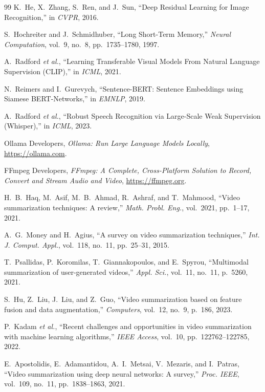 \documentclass[10pt,conference]{IEEEtran}
\begin{document}
\begin{thebibliography}{99}
K.~He, X.~Zhang, S.~Ren, and J.~Sun,
``Deep Residual Learning for Image Recognition,''
in \textit{CVPR}, 2016.

S.~Hochreiter and J.~Schmidhuber,
``Long Short-Term Memory,''
\textit{Neural Computation}, vol.~9, no.~8, pp.~1735--1780, 1997.

A.~Radford \textit{et al.},
``Learning Transferable Visual Models From Natural Language Supervision (CLIP),''
in \textit{ICML}, 2021.

N.~Reimers and I.~Gurevych,
``Sentence-BERT: Sentence Embeddings using Siamese BERT-Networks,''
in \textit{EMNLP}, 2019.

A.~Radford \textit{et al.},
``Robust Speech Recognition via Large-Scale Weak Supervision (Whisper),''
in \textit{ICML}, 2023.

Ollama Developers,
\textit{Ollama: Run Large Language Models Locally},
\url{https://ollama.com}.

FFmpeg Developers,
\textit{FFmpeg: A Complete, Cross-Platform Solution to Record, Convert and
Stream Audio and Video},
\url{https://ffmpeg.org}.

H.~B.~Haq, M.~Asif, M.~B.~Ahmad, R.~Ashraf, and T.~Mahmood,
``Video summarization techniques: A review,''
\textit{Math. Probl. Eng.}, vol.~2021, pp.~1--17, 2021.

A.~G.~Money and H.~Agius,
``A survey on video summarization techniques,''
\textit{Int. J. Comput. Appl.}, vol.~118, no.~11, pp.~25--31, 2015.

T.~Psallidas, P.~Koromilas, T.~Giannakopoulos, and E.~Spyrou,
``Multimodal summarization of user-generated videos,''
\textit{Appl. Sci.}, vol.~11, no.~11, p.~5260, 2021.

S.~Hu, Z.~Liu, J.~Liu, and Z.~Guo,
``Video summarization based on feature fusion and data augmentation,''
\textit{Computers}, vol.~12, no.~9, p.~186, 2023.

P.~Kadam \textit{et al.},
``Recent challenges and opportunities in video summarization with machine
learning algorithms,''
\textit{IEEE Access}, vol.~10, pp.~122762--122785, 2022.

E.~Apostolidis, E.~Adamantidou, A.~I.~Metsai, V.~Mezaris, and I.~Patras,
``Video summarization using deep neural networks: A survey,''
\textit{Proc. IEEE}, vol.~109, no.~11, pp.~1838--1863, 2021.


\end{thebibliography}
\end{document}
